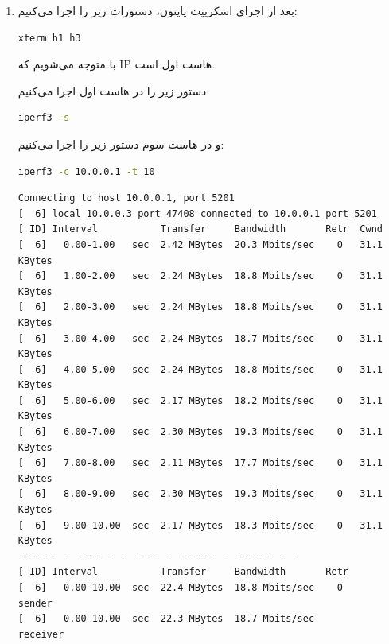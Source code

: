 \documentclass[12pt]{article}
\begin{document}
\begin{enumerate}
	\item 
	بعد از اجرای اسکریپت پایتون، دستورات زیر را اجرا می‌کنیم:
	
	\begin{latin}
	\begin{lstlisting}[language=bash]
		xterm h1 h3
	\end{lstlisting}
\end{latin}

با  متوجه‌ می‌شویم که IP هاست اول  است.

دستور زیر را در هاست اول اجرا می‌کنیم:
	
\begin{latin}
	\begin{lstlisting}[language=bash]
		iperf3 -s
	\end{lstlisting}
\end{latin}

و در هاست سوم دستور زیر را اجرا می‌کنیم:
\begin{latin}
	\begin{lstlisting}[language=bash]
		iperf3 -c 10.0.0.1 -t 10
	\end{lstlisting}
\end{latin}

\begin{latin}
	\begin{Verbatim}
Connecting to host 10.0.0.1, port 5201
[  6] local 10.0.0.3 port 47408 connected to 10.0.0.1 port 5201
[ ID] Interval           Transfer     Bandwidth       Retr  Cwnd
[  6]   0.00-1.00   sec  2.42 MBytes  20.3 Mbits/sec    0   31.1 KBytes       
[  6]   1.00-2.00   sec  2.24 MBytes  18.8 Mbits/sec    0   31.1 KBytes       
[  6]   2.00-3.00   sec  2.24 MBytes  18.8 Mbits/sec    0   31.1 KBytes       
[  6]   3.00-4.00   sec  2.24 MBytes  18.7 Mbits/sec    0   31.1 KBytes       
[  6]   4.00-5.00   sec  2.24 MBytes  18.8 Mbits/sec    0   31.1 KBytes       
[  6]   5.00-6.00   sec  2.17 MBytes  18.2 Mbits/sec    0   31.1 KBytes       
[  6]   6.00-7.00   sec  2.30 MBytes  19.3 Mbits/sec    0   31.1 KBytes       
[  6]   7.00-8.00   sec  2.11 MBytes  17.7 Mbits/sec    0   31.1 KBytes       
[  6]   8.00-9.00   sec  2.30 MBytes  19.3 Mbits/sec    0   31.1 KBytes       
[  6]   9.00-10.00  sec  2.17 MBytes  18.3 Mbits/sec    0   31.1 KBytes       
- - - - - - - - - - - - - - - - - - - - - - - - -
[ ID] Interval           Transfer     Bandwidth       Retr
[  6]   0.00-10.00  sec  22.4 MBytes  18.8 Mbits/sec    0             sender
[  6]   0.00-10.00  sec  22.3 MBytes  18.7 Mbits/sec                  receiver
	

\end{Verbatim}
\end{latin}
\end{enumerate}
\end{document}
